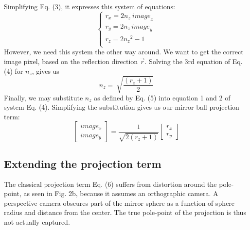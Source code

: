 \documentclass[10pt]{article}
\begin{document}
\begin{multicols}{2}
Simplifying Eq. (3), it expresses this system of equations:
$$\left\{\begin{matrix}r_x=2n_z\ {image}_x\\r_y=2n_{z\ }{image}_y\\r_z=2{n_z}^2-1\ \ \ \ \ \\\end{matrix}\right.$$
However, we need this system the other way around. We want to get the correct image pixel, based on the reflection direction $\vec{r}$. Solving the 3rd equation of Eq. (4) for $n_z$, gives us
$$n_z=\ \sqrt{\frac{\left(r_z+1\right)}{2}}$$
Finally, we may substitute $n_z$ as defined by Eq. (5) into equation 1 and 2 of system Eq. (4). Simplifying the substitution gives us our mirror ball projection term:
$$\begin{bmatrix} image_x \\ image_y \end{bmatrix}=\frac{1}{\sqrt{2(r_z+1)}}\begin{bmatrix} r_x \\ r_y \end{bmatrix}$$

\subsection{Extending the projection term}
The classical projection term Eq. (6) suffers from distortion around the pole-point, as seen in Fig. 2b, because it assumes an orthographic camera. A perspective camera obscures part of the mirror sphere as a function of sphere radius and distance from the center. The true pole-point of the projection is thus not actually captured. 


\end{multicols}
\end{document}
